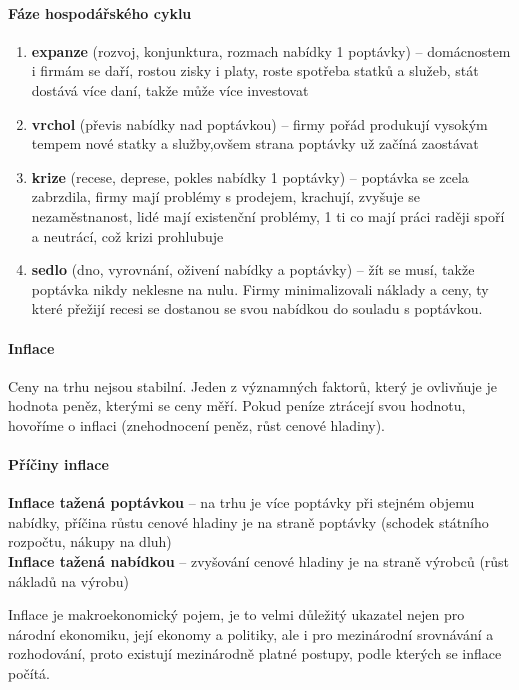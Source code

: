 \paragraph{Fáze hospodářského cyklu}
\begin{enumerate}
    \item \textbf{expanze} (rozvoj, konjunktura, rozmach nabídky 1 poptávky) -- domácnostem i firmám se daří, rostou zisky i platy, roste spotřeba statků a služeb, stát dostává více daní, takže může více investovat
    \item \textbf{vrchol} (převis nabídky nad poptávkou) -- firmy pořád produkují vysokým tempem nové statky a služby,ovšem strana poptávky už začíná zaostávat
    \item \textbf{krize} (recese, deprese, pokles nabídky 1 poptávky) -- poptávka se zcela zabrzdila, firmy mají problémy s prodejem, krachují, zvyšuje se nezaměstnanost, lidé mají existenční problémy, 1 ti co mají práci raději spoří a neutrácí, což krizi prohlubuje
    \item \textbf{sedlo} (dno, vyrovnání, oživení nabídky a poptávky) -- žít se musí, takže poptávka nikdy neklesne na nulu. Firmy minimalizovali náklady a ceny, ty které přežijí recesi se dostanou se svou nabídkou do souladu s poptávkou.
\end{enumerate}

\paragraph{Inflace}
Ceny na trhu nejsou stabilní. Jeden z významných faktorů, který je ovlivňuje je hodnota peněz, kterými se ceny měří. Pokud peníze ztrácejí svou hodnotu, hovoříme o inflaci (znehodnocení peněz, růst cenové hladiny).

\paragraph{Příčiny inflace}
\textbf{Inflace tažená poptávkou} -- na trhu je více poptávky při stejném objemu nabídky, příčina růstu cenové hladiny je na straně poptávky (schodek státního rozpočtu, nákupy na dluh) \\
\textbf{Inflace tažená nabídkou} -- zvyšování cenové hladiny je na straně výrobců (růst nákladů na výrobu)

Inflace je makroekonomický pojem, je to velmi důležitý ukazatel nejen pro národní ekonomiku, její ekonomy a politiky, ale i pro mezinárodní srovnávání a rozhodování, proto existují mezinárodně platné postupy, podle kterých se inflace počítá.

